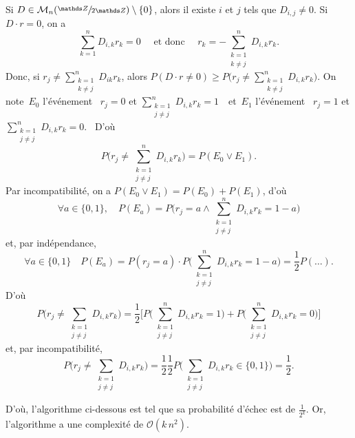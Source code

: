 \begin{prv}
	Si $D \in \mathcal{M}_{n}(\sfrac{\Z}{2\Z}) \setminus \{0\}$, alors il existe $i$\/ et $j$\/ tels que $D_{i,j} \neq 0$. Si $D \cdot r = 0$, on a \[
		\sum_{k=1}^n D_{i,k} r_k = 0 \quad\text{ et donc }\quad r_k = -\sum_{\substack{k=1\\k\neq j}}^{n} D_{i,k} r_k.
	\]
	Donc, si $r_j \neq \sum_{\substack{k=1\\k\neq j}}^n D_{ik} r_k$, alors $P(D\cdot r \neq 0) \ge P\Big(r_j \neq \sum_{\substack{k=1\\k\neq j}}^n D_{i,k}r_k\Big)$.
	On note~$E_0$\/ l'événement \guillemotleft~$r_j = 0$\/ et $\sum_{\substack{k=1\\j \neq j}}^n D_{i,k}r_k = 1$\/~\guillemotright\ et~$E_1$\/ l'événement \guillemotleft~$r_j = 1$\/ et $\sum_{\substack{k=1\\j \neq j}}^n D_{i,k}r_k = 0$.~\guillemotright\@
	D'où \[
		P\Big(r_j \neq \sum_{\substack{k=1\\j \neq j}}^n  D_{i,k} r_k\Big) = P(E_0 \lor E_1)
	.\]
	{\color{red} Par incompatibilité}, on a $P(E_0 \lor E_1) = P(E_0) + P(E_1)$, d'où \[
		\forall a \in \{0,1\},\quad P(E_a) = P\Big(r_j = a \land \sum_{\substack{k=1\\j \neq j}}^n D_{i,k} r_k = 1 - a\Big)
	\] et, {\color{red} par indépendance}, \[
		\forall a \in \{0,1\}\quad P(E_a) = P(r_j = a) \cdot P\Big(\sum_{\substack{k=1\\j \neq j}}^n D_{i,k} r_k = 1-a\Big) = \frac{1}{2}P(\ldots)
	.\]
	D'où \[
		P\Big(r_j \neq \sum_{\substack{k=1\\j \neq j}} D_{i,k} r_k\Big) = \frac{1}{2}\Big[P\Big(\sum_{\substack{k=1\\j \neq j}}^n D_{i,k} r_k = 1\Big) + P\Big(\sum_{\substack{k=1\\j \neq j}}^n D_{i,k}r_k = 0\Big)\Big]
	\] et, {\color{red}par incompatibilité}, \[
		P\Big(r_j \neq \sum_{\substack{k=1\\j \neq j}} D_{i,k} r_k\Big) = \frac{1}{2} \frac{1}{2} P\Big(\sum_{\substack{k=1\\j \neq j}} D_{i,k} r_k \in \{0,1\}\Big) = \frac{1}{2}
	.\]
\end{prv}

D'où, l'algorithme ci-dessous est tel que sa probabilité d'échec est de $\frac{1}{2^k}$. Or, l'algorithme a une complexité de $\mathcal{O}(k\,n^2)$.

